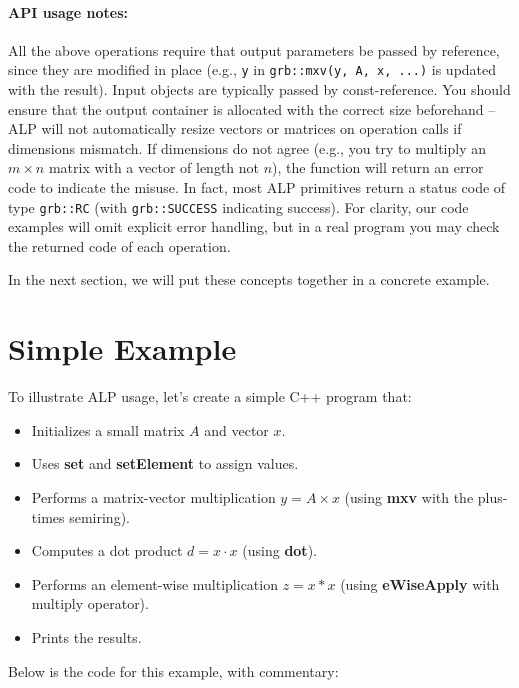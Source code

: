 \paragraph{API usage notes:} All the above operations require that output parameters be passed by reference, since they are modified in place (e.g., \texttt{y} in \texttt{grb::mxv(y, A, x, ...)} is updated with the result). Input objects are typically passed by const-reference. You should ensure that the output container is allocated with the correct size beforehand – ALP will not automatically resize vectors or matrices on operation calls if dimensions mismatch. If dimensions do not agree (e.g., you try to multiply an $m\times n$ matrix with a vector of length not $n$), the function will return an error code to indicate the misuse. In fact, most ALP primitives return a status code of type \texttt{grb::RC} (with \texttt{grb::SUCCESS} indicating success). For clarity, our code examples will omit explicit error handling, but in a real program you may check the returned code of each operation.

In the next section, we will put these concepts together in a concrete example.



\section{Simple Example}\label{sec:simple_example}

To illustrate ALP usage, let's create a simple C++ program that:
\begin{itemize}
\item Initializes a small matrix $A$ and vector $x$.
\item Uses \textbf{set} and \textbf{setElement} to assign values.
\item Performs a matrix-vector multiplication $y = A \times x$ (using \textbf{mxv} with the plus-times semiring).
\item Computes a dot product $d = x \cdot x$ (using \textbf{dot}).
\item Performs an element-wise multiplication $z = x * x$ (using \textbf{eWiseApply} with multiply operator).
\item Prints the results.
\end{itemize}

Below is the code for this example, with commentary:

